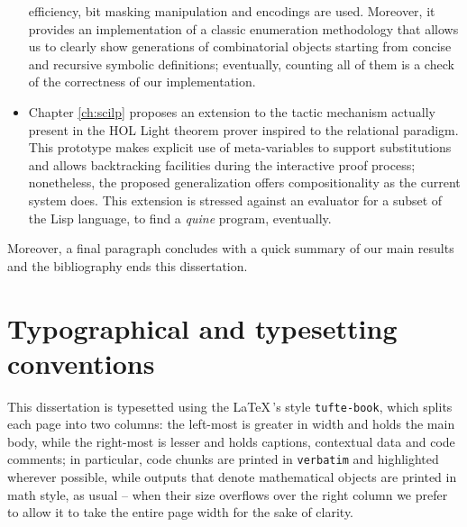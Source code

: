 \begin{itemize}
efficiency, bit masking manipulation and encodings are used. Moreover, it
provides an implementation of a classic enumeration methodology that allows us
to clearly show generations of combinatorial objects starting from concise and
recursive symbolic definitions; eventually, counting all of them is a check of
the correctness of our implementation.
\item Chapter \ref{ch:scilp} proposes an extension to the tactic mechanism
actually present in the HOL Light theorem prover inspired to the relational
paradigm. This prototype makes explicit use of meta-variables to support
substitutions and allows backtracking facilities during the interactive proof
process; nonetheless, the proposed generalization offers compositionality as
the current system does. This extension is stressed against an evaluator for a
subset of the Lisp language, to find a \textit{quine} program, eventually.
\end{itemize}

Moreover, a final paragraph concludes with a quick summary of our main results
and the bibliography ends this dissertation.

\section*{Typographical and typesetting conventions}

This dissertation is typesetted using the \LaTeX\,'s style \verb|tufte-book|,
which splits each page into two columns: the left-most is greater in width and
holds the main body, while the right-most is lesser and holds captions,
contextual data and code comments; in particular, code chunks are printed in
\verb|verbatim| and highlighted wherever possible, while outputs that denote
mathematical objects are printed in math style, as usual -- when their size
overflows over the right column we prefer to allow it to take the entire
page width for the sake of clarity.





